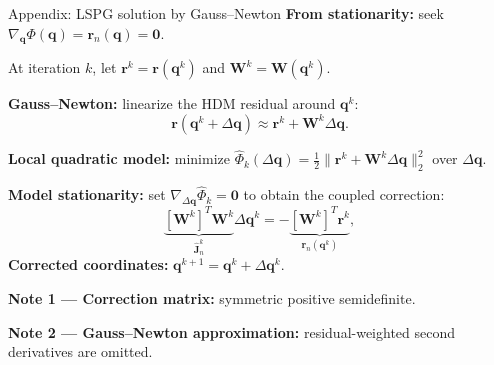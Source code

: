 \documentclass[aspectratio=169]{beamer}
\newcommand{\vect}[1]{\boldsymbol{#1}}
\newcommand{\matr}[1]{\boldsymbol{#1}}
\begin{document}
\begin{frame}{Appendix: LSPG solution by Gauss--Newton}
\small
\setlength{\abovedisplayskip}{6pt}
\setlength{\belowdisplayskip}{6pt}
\setlength{\abovedisplayshortskip}{6pt}
\setlength{\belowdisplayshortskip}{6pt}
\textbf{From stationarity:} seek
$\nabla_{\vect{q}}\Phi(\vect{q})=\vect{r}_n(\vect{q})=\vect{0}$.

At iteration $k$, let $\vect{r}^{k}=\vect{r}(\vect{q}^{k})$
and $\matr{W}^{k}=\matr{W}(\vect{q}^{k})$.

\textbf{Gauss--Newton:} linearize the HDM residual around $\vect{q}^{k}$:
\[
  \vect{r}(\vect{q}^{k}+\Delta\vect{q})
  \approx\vect{r}^{k}+\matr{W}^{k}\Delta\vect{q}.
\]

\textbf{Local quadratic model:} minimize
$\widehat\Phi_k(\Delta\vect{q})=\tfrac12\|\vect{r}^{k}+\matr{W}^{k}\Delta\vect{q}\|_2^2$
over $\Delta\vect{q}$.

\textbf{Model stationarity:} set
$\nabla_{\Delta\vect{q}}\widehat\Phi_k=\vect{0}$ to obtain the coupled correction:
\[
  \underbrace{[\matr{W}^{k}]^T\matr{W}^{k}}
             _{\displaystyle\widehat{\matr{J}}_n^{k}}
  \Delta\vect{q}^{k}
  =-\underbrace{[\matr{W}^{k}]^T\vect{r}^{k}}
              _{\displaystyle\vect{r}_n(\vect{q}^{k})},
\]
\textbf{Corrected coordinates:}
$\vect{q}^{k+1}=\vect{q}^{k}+\Delta\vect{q}^{k}$.

\vspace{0.4em}
{\footnotesize
  \textbf{Note 1 --- Correction matrix:} symmetric positive semidefinite.\par
  \smallskip
  \textbf{Note 2 --- Gauss--Newton approximation:}
  residual-weighted second derivatives are omitted.
}
\end{frame}
\end{document}
